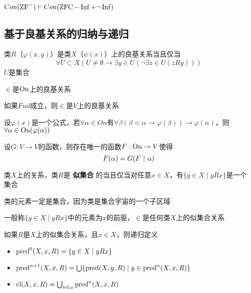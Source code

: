 \documentclass[11pt]{article}
\begin{document}
\begin{corollary}[]
\(Con(\text{ZF}^-)\vdash Con(\operatorname{ZFC}-\operatorname{Inf}+\neg\operatorname{Inf})\)
\end{corollary}
\subsection{基于良基关系的归纳与递归}
\label{sec:org68802a9}
\begin{definition}[]
类\(R\)（\(\varphi(x,y)\)）是类\(X\)（\(\psi(x)\)）上的良基关系当且仅当
\begin{equation*}
\forall U\subset X(U\neq\emptyset\to\exists y\in U(\neg\exists z\in U(zRy)))
\end{equation*}
\(U\)是集合
\end{definition}

\begin{examplle}[]
\(\in\)是\(\operatorname{On}\)上的良基关系

如果\(Fnd\)成立，则\(\in\)是\(V\)上的良基关系
\end{examplle}

\begin{theorem}[超穷归纳原理]
设\(\varphi(x)\)是一个公式，若\(\forall\alpha\in On\)有\(\forall\beta(\beta<\alpha\to\varphi(\beta))\to\varphi(\alpha)\)，则\(\forall\alpha\in\operatorname{On}(\varphi(\alpha))\)
\end{theorem}

\begin{theorem}[超穷递归定理]
设\(G:V\to V\)的函数，则存在唯一的函数\(F:\operatorname{On}\to V\)使得
\begin{equation*}
F(\alpha)=G(F\upharpoonright\alpha)
\end{equation*}
\end{theorem}

\begin{definition}[]
类\(X\)上的关系，类\(R\)是 \textbf{似集合} 的当且仅当对任意\(x\in X\)，有\(\{y\in X\mid yRx\}\)是一个集合
\end{definition}

类的元素一定是集合，因为类是集合宇宙的一个子区域

一般称\(\{y\in X\mid yRx\}\)中的元素为\(x\)的前驱，\(\in\)是任何类\(X\)上的似集合关系

\begin{definition}[]
如果\(R\)是\(X\)上的似集合关系，且\(x\in X\)，则递归定义
\begin{itemize}
\item \(\text{pred}^0(X,x,R)=\{y\in X\mid yRx\}\)
\item \(\text{pred}^{n+1}(X,x,R)=\bigcup\{\text{pred}(X,y,R)\mid y\in\text{pred}^n(X,x,R)\}\)
\item \(\operatorname{\text{cl}}(X,x,R)=\bigcup_{n\in\omega}\text{pred}^n(X,x,R)\)
\end{itemize}
\end{definition}
\end{document}
